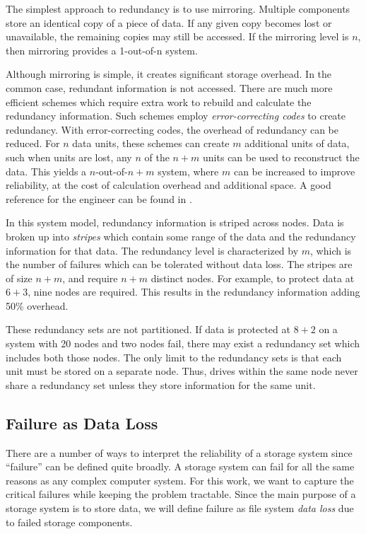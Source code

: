 \documentclass[11pt]{article}
\numberwithin{equation}{section}
\begin{document}
The simplest approach to redundancy is to use mirroring.  Multiple components
store an identical copy of a piece of data.  If any given copy becomes lost or
unavailable, the remaining copies may still be accessed.  If the mirroring
level is $n$, then mirroring provides a 1-out-of-n system.

Although mirroring is simple, it creates significant storage overhead.  In the
common case, redundant information is not accessed.  There are much more
efficient schemes which require extra work to rebuild and calculate the
redundancy information.  Such schemes employ {\em error-correcting codes} to
create redundancy.  With error-correcting codes, the overhead of redundancy
can be reduced.  For $n$ data units, these schemes can create $m$ additional
units of data, such when units are lost, any $n$ of the $n+m$ units can be
used to reconstruct the data.  This yields a $n$-out-of-$n+m$ system, where
$m$ can be increased to improve reliability, at the cost of calculation
overhead and additional space.  A good reference for the engineer can be
found in \cite{plank}.  

In this system model, redundancy information is striped across nodes.  Data is
broken up into {\em stripes} which contain some range of the data and the
redundancy information for that data.  The redundancy level is characterized
by $m$, which is the number of failures which can be tolerated without data
loss.  The stripes are of size $n+m$, and require $n+m$ distinct nodes.  For
example, to protect data at $6+3$, nine nodes are required.  This results in
the redundancy information adding 50\% overhead.

These redundancy sets are not partitioned.  If data is protected at $8+2$ on a
system with 20 nodes and two nodes fail, there may exist a redundancy set
which includes both those nodes.  The only limit to the redundancy sets is
that each unit must be stored on a separate node.  Thus, drives within the
same node never share a redundancy set unless they store information for the
same unit.

\subsection{Failure as Data Loss}

There are a number of ways to interpret the reliability of a storage system
since ``failure'' can be defined quite broadly.  A storage system can fail for
all the same reasons as any complex computer system.  For this work, we want
to capture the critical failures while keeping the problem tractable.  
Since the main purpose of a storage system is to store data, we will define
failure as file system {\em data loss} due to failed storage components. 
\end{document}
